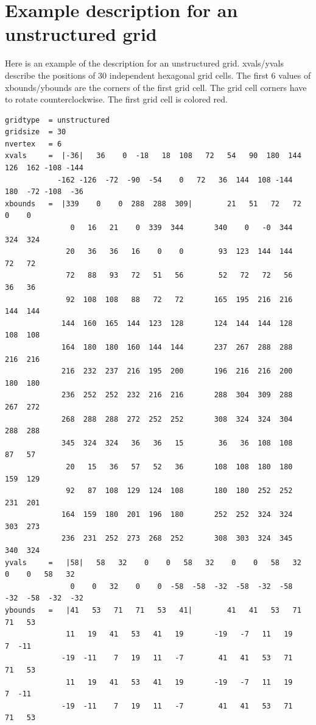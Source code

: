 \section{Example description for an unstructured grid}
Here is an example of the {\CDO} description for an unstructured grid.
xvals/yvals describe the positions of 30 independent hexagonal grid cells.
The first 6 values of xbounds/ybounds are the corners of the first
grid cell.
The grid cell corners have to rotate counterclockwise.
The first grid cell is colored red.
\begin{lstlisting}[frame=single, backgroundcolor=\color{pcolor1}, basicstyle=\footnotesize]
gridtype  = unstructured
gridsize  = 30
nvertex   = 6
xvals     =  |-36|   36    0  -18   18  108   72   54   90  180  144  126  162 -108 -144 
            -162 -126  -72  -90  -54    0   72   36  144  108 -144  180  -72 -108  -36 
xbounds   =  |339    0    0  288  288  309|        21   51   72   72    0    0
               0   16   21    0  339  344       340    0   -0  344  324  324
              20   36   36   16    0    0        93  123  144  144   72   72
              72   88   93   72   51   56        52   72   72   56   36   36
              92  108  108   88   72   72       165  195  216  216  144  144
             144  160  165  144  123  128       124  144  144  128  108  108
             164  180  180  160  144  144       237  267  288  288  216  216
             216  232  237  216  195  200       196  216  216  200  180  180
             236  252  252  232  216  216       288  304  309  288  267  272
             268  288  288  272  252  252       308  324  324  304  288  288
             345  324  324   36   36   15        36   36  108  108   87   57
              20   15   36   57   52   36       108  108  180  180  159  129
              92   87  108  129  124  108       180  180  252  252  231  201
             164  159  180  201  196  180       252  252  324  324  303  273
             236  231  252  273  268  252       308  303  324  345  340  324
yvals     =   |58|   58   32    0    0   58   32    0    0   58   32    0    0   58   32 
               0    0   32    0    0  -58  -58  -32  -58  -32  -58  -32  -58  -32  -32 
ybounds   =   |41   53   71   71   53   41|        41   41   53   71   71   53
              11   19   41   53   41   19       -19   -7   11   19    7  -11
             -19  -11    7   19   11   -7        41   41   53   71   71   53
              11   19   41   53   41   19       -19   -7   11   19    7  -11
             -19  -11    7   19   11   -7        41   41   53   71   71   53

\end{lstlisting}
